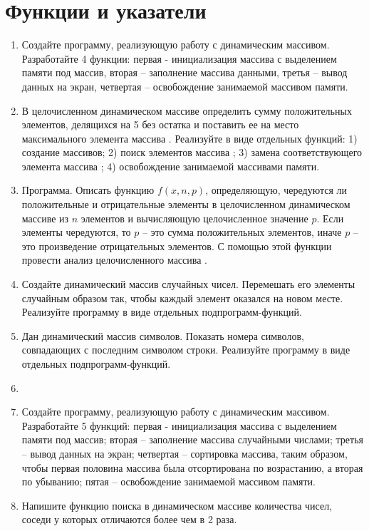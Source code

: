 \section{Функции и указатели}
\begin{enumerate}[leftmargin=*]
    \item Создайте программу, реализующую работу с динамическим массивом. Разработайте 4 функции: первая - инициализация массива с выделением памяти под массив, вторая – заполнение массива данными, третья – вывод данных на экран, четвертая – освобождение занимаемой массивом памяти. 
    \item В целочисленном динамическом массиве  определить сумму положительных элементов, делящихся на 5 без остатка и поставить ее на место максимального элемента массива . Реализуйте в виде отдельных функций: 1) создание массивов; 2) поиск элементов массива ; 3) замена соответствующего элемента массива ; 4) освобождение занимаемой массивами памяти.
    \item Программа. Описать функцию $f(x, n, p)$, определяющую, чередуются ли положительные и отрицательные элементы в целочисленном динамическом массиве  из $n$ элементов и вычисляющую целочисленное значение $p$. Если элементы чередуются, то $p$ – это сумма положительных элементов, иначе $p$ – это произведение отрицательных элементов. С помощью этой функции провести анализ целочисленного массива .
    \item Создайте динамический массив случайных чисел. Перемешать его элементы случайным образом так, чтобы каждый элемент оказался на новом месте. Реализуйте программу в виде отдельных подпрограмм-функций.
    \item Дан динамический массив символов. Показать номера символов, совпадающих с последним символом строки. Реализуйте программу в виде отдельных подпрограмм-функций.
    \item \item Создайте программу, реализующую работу с динамическим массивом. Разработайте 5 функций: первая - инициализация массива с выделением памяти под массив; вторая – заполнение массива случайными числами; третья – вывод данных на экран; четвертая – сортировка массива, таким образом, чтобы первая половина массива была отсортирована по возрастанию, а вторая по убыванию; пятая – освобождение занимаемой массивом памяти.
    \item Напишите функцию поиска в динамическом массиве количества чисел, соседи у которых отличаются более чем в 2 раза.

\end{enumerate}
